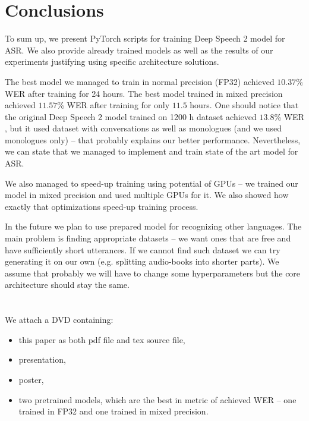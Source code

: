 \documentclass[licencjacka,en]{pracamgr}
\begin{document}
	
	\chapter{Conclusions}\label{r:concls}
	
	To sum up, we present PyTorch scripts for training Deep Speech 2 model for ASR. We also provide already trained models as well as the results of our experiments justifying using specific architecture solutions.
	
	The best model we managed to train in normal precision (FP32) achieved $10.37$\% WER after training for 24 hours. The best model trained in mixed precision achieved $11.57$\% WER after training for only $11.5$ hours. One should notice that the original Deep Speech 2 model trained on 1200 h dataset achieved $13.8$\% WER \cite{DS2}, but it used dataset with conversations as well as monologues (and we used monologues only) -- that probably explains our better performance. Nevertheless, we can state that we managed to implement and train state of the art model for ASR.
	
	We also managed to speed-up training using potential of GPUs -- we trained our model in mixed precision and used multiple GPUs for it. We also showed how exactly that optimizations speed-up training process.
	
	In the future we plan to use prepared model for recognizing other languages. The main problem is finding appropriate datasets -- we want ones that are free and have sufficiently short utterances. If we cannot find such dataset we can try generating it on our own (e.g. splitting audio-books into shorter parts). We assume that probably we will have to change some hyperparameters but the core architecture should stay the same.
	
	\appendix
	
	\chapter{}
	
	We attach a DVD containing: 
	
	\begin{itemize}
		\item this paper as both pdf file and tex source file,
		\item presentation,
		\item poster,
		\item two pretrained models, which are the best in metric of achieved WER -- one trained in FP32 and one trained in mixed precision.
	\end{itemize}
	
\end{document}
